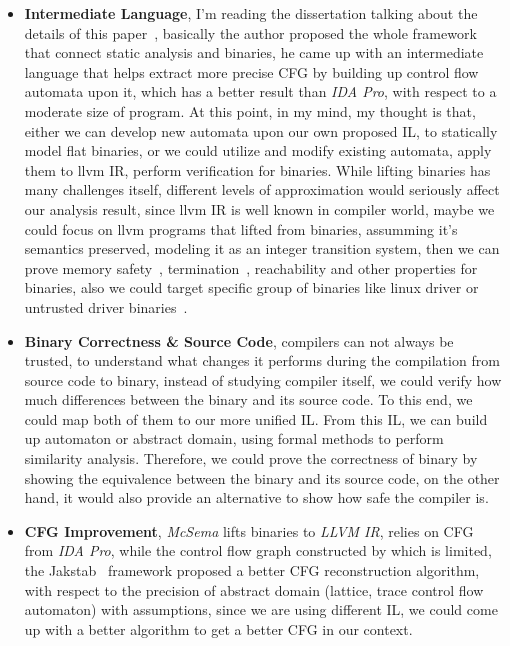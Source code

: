\documentclass{article}
\begin{document}
\begin{itemize}
    \item
        \textbf{Intermediate Language}, I'm reading the dissertation talking about the details of this paper~\cite{jakstab}, basically the author proposed the whole framework that connect static analysis and binaries, he came up with an intermediate language that helps extract more precise CFG by building up control flow automata upon it, which has a better result than \emph{IDA Pro}, with respect to a moderate size of program. At this point, in my mind, my thought is that, either we can develop
        new automata upon our own proposed IL, to statically model flat binaries, or we could utilize and modify existing automata, apply them to llvm IR, perform verification for binaries. While lifting binaries has many challenges itself, different levels of approximation would seriously affect our analysis result, since llvm IR is well known in compiler world, maybe we could focus on llvm programs that lifted from binaries, assumming it's semantics preserved, modeling it as an integer
        transition system, then we can prove memory safety~\cite{llvm}, termination~\cite{falke}, reachability and other properties for binaries, also we could target specific group of binaries like linux driver or untrusted driver binaries~\cite{kinder2010}.

      \item
        \textbf{Binary Correctness \& Source Code}, compilers can not always be trusted, to understand what changes it performs during the compilation from source code to binary, instead of studying compiler itself, we could verify how much differences between the binary and its source code. To this end, we could map both of them to our more unified IL. From this IL, we can build up automaton or abstract domain, using formal methods to perform similarity analysis. Therefore, we could prove the correctness of binary by showing the equivalence between the binary and its source code, on the other hand, it would also provide an alternative to show how safe the compiler is.

      \item
        \textbf{CFG Improvement}, \emph{McSema} lifts binaries to \emph{LLVM IR}, relies on CFG from \emph{IDA Pro}, while the control flow graph constructed by which is limited, the Jakstab~\cite{jakstab} framework proposed a better CFG reconstruction algorithm, with respect to the precision of abstract domain (lattice, trace control flow automaton) with assumptions, since we are using different IL, we could come up with a better algorithm to get a better CFG in our context.


\end{itemize}
\end{document}
